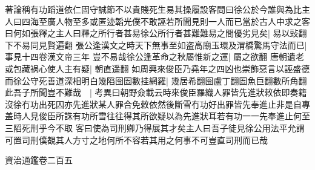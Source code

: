 著論稱有功蹈道依仁固守誠節不以貴賤死生易其操履設客問曰徐公於今誰與為比主人曰四海至廣人物至多或匿迹韜光僕不敢誣若所聞見則一人而已當於古人中求之客曰何如張釋之主人曰釋之所行者甚易徐公所行者甚難難易之間優劣見矣|{
	易以䜴翻下不易同見賢遍翻}
張公逢漢文之時天下無事至如盗高廟玉環及渭橋驚馬守法而已|{
	事見十四卷漢文帝三年}
豈不易哉徐公逢革命之秋屬惟新之運|{
	屬之欲翻}
唐朝遺老或包藏祸心使人主有疑|{
	朝直遥翻}
如周興來俊臣乃堯年之四凶也崇飾惡言以誣盛德而徐公守死善道深相明白幾䧟囹圄數挂網羅|{
	幾居希翻囹盧丁翻圄魚巨翻數所角翻}
此吾子所聞豈不難哉　|{
	考異曰朝野僉載云時來俊臣羅織人罪皆先進狀敕依即奏籍沒徐冇功出死囚亦先進狀某人罪合免敕依然後斷雪冇功好出罪皆先奉進止非是自專盖時人見俊臣所誅有功所雪往往得其所欲疑以為先進狀耳若有功一一先奉進止何至三䧟死刑乎今不取}
客曰使為司刑卿乃得展其才矣主人曰吾子徒見徐公用法平允謂可置司刑僕覩其人方寸之地何所不容若其用之何事不可豈直司刑而已哉

資治通鑑卷二百五

